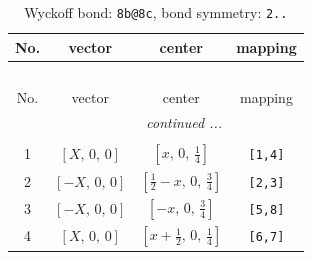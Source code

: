 \documentclass[fleqn,8pt]{jsarticle}
\begin{document}
\renewcommand{\arraystretch}{1.2}
\begin{longtable}{cccc}
\caption{Wyckoff bond: {\tt 8b@8c}, bond symmetry: {\tt 2..}}
 \\
 \hline \hline
No. & vector & center & mapping \\ \hline \endfirsthead

\multicolumn{3}{l}{\tablename\ \thetable{}} \\
 \hline \hline
No. & vector & center & mapping \\ \hline \endhead

 \hline \hline
\multicolumn{3}{r}{\footnotesize\it continued ...} \\ \endfoot

 \hline \hline
\multicolumn{3}{r}{} \\ \endlastfoot

1 & $\left[ X,\, 0,\, 0 \right]$ & $\left[ x,\, 0,\, \frac{1}{4} \right]$ & {\tt [1,4]} \\ \hline
2 & $\left[ - X,\, 0,\, 0 \right]$ & $\left[ \frac{1}{2} - x,\, 0,\, \frac{3}{4} \right]$ & {\tt [2,3]} \\ \hline
3 & $\left[ - X,\, 0,\, 0 \right]$ & $\left[ - x,\, 0,\, \frac{3}{4} \right]$ & {\tt [5,8]} \\ \hline
4 & $\left[ X,\, 0,\, 0 \right]$ & $\left[ x + \frac{1}{2},\, 0,\, \frac{1}{4} \right]$ & {\tt [6,7]} \\
\end{longtable}
\renewcommand{\arraystretch}{1.2}
\end{document}
